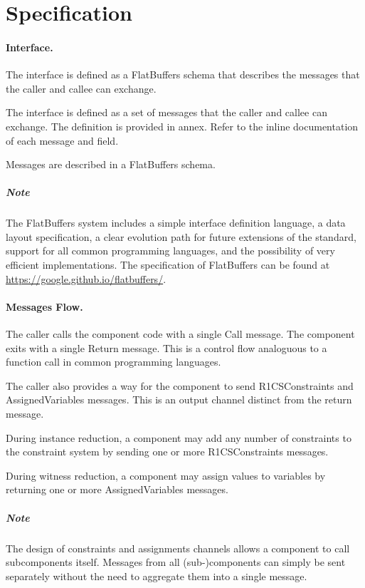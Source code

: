 \section{Specification}

\paragraph{Interface.}

	The interface is defined as a FlatBuffers schema that describes 
	the messages that the caller and callee can exchange.

	The interface is defined as a set of messages that the caller and callee can exchange.
	The definition is provided in annex. Refer to the inline documentation of each message and field.

	Messages are described in a FlatBuffers schema.

	\subparagraph{Note}
	The FlatBuffers system includes a simple interface definition language,
	a data layout specification,
	a clear evolution path for future extensions of the standard,
	support for all common programming languages,
	and the possibility of very efficient implementations.
	The specification of FlatBuffers can be found at
	\href{https://google.github.io/flatbuffers/}{https://google.github.io/flatbuffers/}.

\paragraph{Messages Flow.}

	The caller calls the component code with a single Call message.
	The component exits with a single Return message.
	This is a control flow analoguous to a function call in common programming languages.

	The caller also provides a way for the component to send 
	R1CSConstraints and AssignedVariables messages.
	This is an output channel distinct from the return message.

	During instance reduction,
	a component may add any number of constraints to the constraint system
	by sending one or more R1CSConstraints messages.

	During witness reduction,
	a component may assign values to variables
	by returning one or more AssignedVariables messages.

	\subparagraph{Note}
	The design of constraints and assignments channels
	allows a component to call subcomponents itself.
	Messages from all (sub-)components can simply be sent separately
	without the need to aggregate them into a single message.
	
